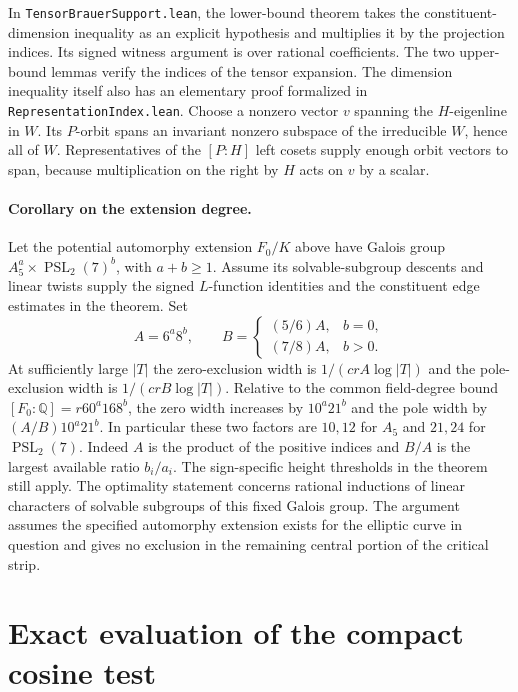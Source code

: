\documentclass[11pt]{article}
\begin{document}
In \texttt{TensorBrauerSupport.lean}, the lower-bound theorem takes the constituent-dimension inequality as an explicit hypothesis and multiplies it by the projection indices. Its signed witness argument is over rational coefficients. The two upper-bound lemmas verify the indices of the tensor expansion. The dimension inequality itself also has an elementary proof formalized in \texttt{RepresentationIndex.lean}. Choose a nonzero vector $v$ spanning the $H$-eigenline in $W$. Its $P$-orbit spans an invariant nonzero subspace of the irreducible $W$, hence all of $W$. Representatives of the $[P:H]$ left cosets supply enough orbit vectors to span, because multiplication on the right by $H$ acts on $v$ by a scalar.

\paragraph{Corollary on the extension degree.}
Let the potential automorphy extension $F_0/K$ above have Galois group
$A_5^a\times\operatorname{PSL}_2(7)^b$, with $a+b\ge1$. Assume its solvable-subgroup descents and linear twists supply the signed $L$-function identities and the constituent edge estimates in the theorem. Set
\[
 A=6^a8^b,\qquad
 B=\begin{cases}(5/6)A,&b=0,\\(7/8)A,&b>0.\end{cases}
\]
At sufficiently large $|T|$ the zero-exclusion width is $1/(crA\log|T|)$ and the pole-exclusion width is $1/(crB\log|T|)$. Relative to the common field-degree bound $[F_0:\mathbb Q]=r60^a168^b$, the zero width increases by $10^a21^b$ and the pole width by $(A/B)10^a21^b$. In particular these two factors are $10,12$ for $A_5$ and $21,24$ for $\operatorname{PSL}_2(7)$. Indeed $A$ is the product of the positive indices and $B/A$ is the largest available ratio $b_i/a_i$. The sign-specific height thresholds in the theorem still apply. The optimality statement concerns rational inductions of linear characters of solvable subgroups of this fixed Galois group. The argument assumes the specified automorphy extension exists for the elliptic curve in question and gives no exclusion in the remaining central portion of the critical strip.


\section{Exact evaluation of the compact cosine test}
\label{sec:compact-cosine-resolvent}
\end{document}
